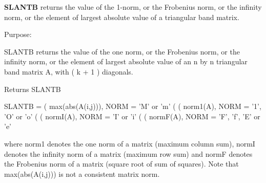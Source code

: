 {\bfseries S\+L\+A\+N\+T\+B} returns the value of the 1-\/norm, or the Frobenius norm, or the infinity norm, or the element of largest absolute value of a triangular band matrix. 

 \begin{DoxyParagraph}{Purpose\+: }
\begin{DoxyVerb} SLANTB  returns the value of the one norm,  or the Frobenius norm, or
 the  infinity norm,  or the element of  largest absolute value  of an
 n by n triangular band matrix A,  with ( k + 1 ) diagonals.\end{DoxyVerb}

\end{DoxyParagraph}
\begin{DoxyReturn}{Returns}
S\+L\+A\+N\+T\+B \begin{DoxyVerb}    SLANTB = ( max(abs(A(i,j))), NORM = 'M' or 'm'
             (
             ( norm1(A),         NORM = '1', 'O' or 'o'
             (
             ( normI(A),         NORM = 'I' or 'i'
             (
             ( normF(A),         NORM = 'F', 'f', 'E' or 'e'

 where  norm1  denotes the  one norm of a matrix (maximum column sum),
 normI  denotes the  infinity norm  of a matrix  (maximum row sum) and
 normF  denotes the  Frobenius norm of a matrix (square root of sum of
 squares).  Note that  max(abs(A(i,j)))  is not a consistent matrix norm.\end{DoxyVerb}
 
\end{DoxyReturn}

